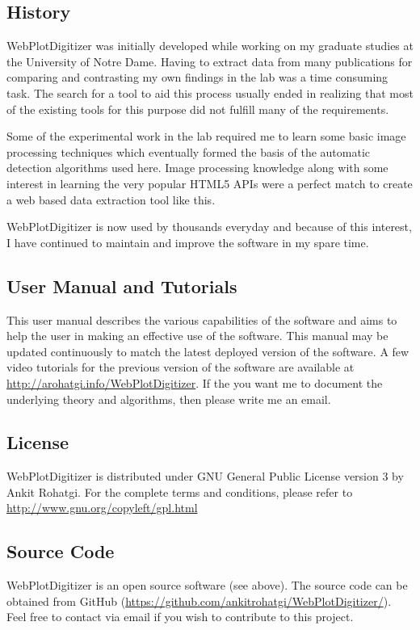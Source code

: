 \documentclass[letterpaper, 10pt]{article}
\begin{document}
\subsection{History}
WebPlotDigitizer was initially developed while working on my graduate studies at the University of Notre Dame. Having to extract data from many publications for comparing and contrasting my own findings in the lab was a time consuming task. The search for a tool to aid this process usually ended in realizing that most of the existing tools for this purpose did not fulfill many of the requirements. 

Some of the experimental work in the lab required me to learn some basic image processing techniques which eventually formed the basis of the automatic detection algorithms used here. Image processing knowledge along with some interest in learning the very popular HTML5 APIs were a perfect match to create a web based data extraction tool like this.

WebPlotDigitizer is now used by thousands everyday and because of this interest, I have continued to maintain and improve the software in my spare time.

\subsection{User Manual and Tutorials}
This user manual describes the various capabilities of the software and aims to help the user in making an effective use of the software. This manual may be updated continuously to match the latest deployed version of the software. A few video tutorials for the previous version of the software are available at \url{http://arohatgi.info/WebPlotDigitizer}. If the you want me to document the underlying theory and algorithms, then please write me an email.

\subsection{License}
WebPlotDigitizer is distributed under GNU General Public License version 3 by Ankit Rohatgi. For the complete terms and conditions, please refer to \url{http://www.gnu.org/copyleft/gpl.html}

\subsection{Source Code}
WebPlotDigitizer is an open source software (see above). The source code can be obtained from GitHub (\url{https://github.com/ankitrohatgi/WebPlotDigitizer/}). Feel free to contact via email if you wish to contribute to this project.
\end{document}
